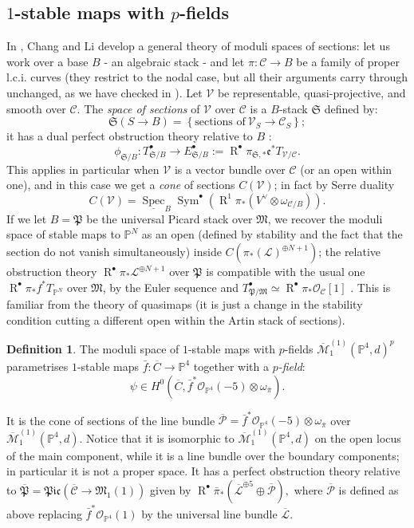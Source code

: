 \documentclass[11pt]{amsart}
\newcommand{\oM}{\overline{\mathcal{M}}}
\newcommand{\PP}{\mathbb P}
\newcommand{\OO}{\mathcal{O}}
\renewcommand{\to}{\rightarrow}
\newcommand{\MM}{\mathfrak M}
\newcommand{\Spec}{\operatorname{Spec}}
\newcommand{\R}{\operatorname{R}^{\bullet}}
\newcommand{\cC}{\mathcal{C}}
\theoremstyle{definition}
\theoremstyle{definition}
\newtheorem{dfn}[thm]{Definition}
\begin{document}
\subsection{$1$-stable maps with $p$-fields} In \cite{CLpfields}, Chang and Li develop a general theory of moduli spaces of sections: let us work over a base $B$ - an algebraic stack - and let $\pi\colon \cC\to B$ be a family of proper l.c.i. curves (they restrict to the nodal case, but all their arguments carry through unchanged, as we have checked in \cite[\S 3]{BCM}). Let $\mathcal V$ be representable, quasi-projective, and smooth over $\cC$. The \emph{space of sections} of $\mathcal V$ over $\cC$ is a $B$-stack $\mathfrak S$ defined by:
 \[\mathfrak{S}(S\to B)=\left\{\text{sections of}\ \mathcal V_S\to\cC_S\right\};\]
it has a dual perfect obstruction theory relative to $B$ \cite[Proposition 2.5]{CLpfields}:
\[ \phi_{\mathfrak S/B}\colon T^{\bullet}_{\mathfrak S/B}\to E^{\bullet}_{\mathfrak S/B}:=\R\pi_{\mathfrak S,*}\mathfrak e^* T_{\mathcal V/\cC}.\]
This applies in particular when $\mathcal V$ is a vector bundle over $\mathcal C$ (or an open within one), and in this case we get a \emph{cone} of sections $C(\mathcal V)$; in fact by Serre duality \[C(\mathcal V)=\underline{\Spec}_B\operatorname{Sym}^\bullet(\operatorname{R}^1\pi_* (V^\vee\otimes \omega_{\mathcal C/B})).\] If we let $B=\mathfrak{P}$ be the universal Picard stack over $\MM$, we recover the moduli space of stable maps to $\PP^N$ as an open (defined by stability and the fact that the section do not vanish simultaneously) inside $C(\pi_*(\mathcal L)^{\oplus N+1})$; the relative obstruction theory $\R\pi_*\mathcal L^{\oplus N+1}$ over $\mathfrak{P}$ is compatible with the usual one $\R\pi_*f^*T_{\PP^N}$  over $\MM$, by the Euler sequence and $T^{\bullet}_{\mathfrak P/\MM}\simeq\R\pi_*\OO_{\mathcal C}[1]$ \cite[Lemma 2.8]{CLpfields}. This is familiar from the theory of quasimaps (it is just a change in the stability condition cutting a different open within the Artin stack of sections).
\begin{dfn}
 The moduli space of $1$-stable maps with $p$-fields $\oM_1^{(1)}(\PP^4,d)^p$ parametrises $1$-stable maps $\bar{f}\colon\overline{C}\to\PP^4$ together with a \emph{$p$-field}: \[\psi \in  H^0(\overline{C},\bar{f}^*\OO_{\PP^4}(-5)\otimes\omega_{\bar{\pi}}).\]
\end{dfn}
 \noindent It is the cone of sections of the line bundle $\overline{\mathcal P}=\bar{f}^*\OO_{\PP^4}(-5)\otimes\omega_{\bar{\pi}}$ over $\oM_1^{(1)}(\PP^4,d)$. Notice that it is isomorphic to $\oM_1^{(1)}(\PP^4,d)$ on the open locus of the main component, while it is a line bundle over the boundary components; in particular it is not a proper space. It has a perfect obstruction theory relative to $\overline{\mathfrak P}=\mathfrak{Pic}(\overline{\mathcal C}\to\MM_1(1))$ given by $\R\bar{\pi}_*(\overline{\mathcal L}^{\oplus 5}\oplus \overline{\mathcal P}),$
 where $\overline{\mathcal P}$ is defined as above replacing $\bar{f}^*\OO_{\PP^4}(1)$ by the universal line bundle $\overline{\mathcal L}$.
\end{document}
